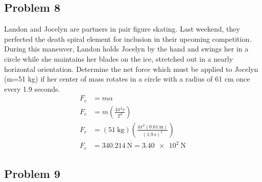 \documentclass{article}
\begin{document}
\subsection{Problem 8}

Landon and Jocelyn are partners in pair figure skating. Last weekend, they perfected the death spiral element for inclusion in their upcoming competition. During this maneuver, Landon holds Jocelyn by the hand and swings her in a circle while she maintains her blades on the ice, stretched out in a nearly horizontal orientation. Determine the net force which must be applied to Jocelyn (m=51 kg) if her center of mass rotates in a circle with a radius of 61 cm once every 1.9 seconds.
\begin{align*}
	F_c & = m\alpha \\
	F_c & = m \left( \frac{ 4\pi^2 r }{ T^2 } \right) \\
	F_c & = (\SI{51}{\kilogram}) \left( \frac{ 4\pi^2(\SI{0.61}{\meter}) }{ (\SI{1.9}{\second})^2 } \right) \\
	F_c & = \SI{340.214}{\newton} = \SI{3.40e2}{\newton}
\end{align*}

\subsection{Problem 9}
\end{document}
